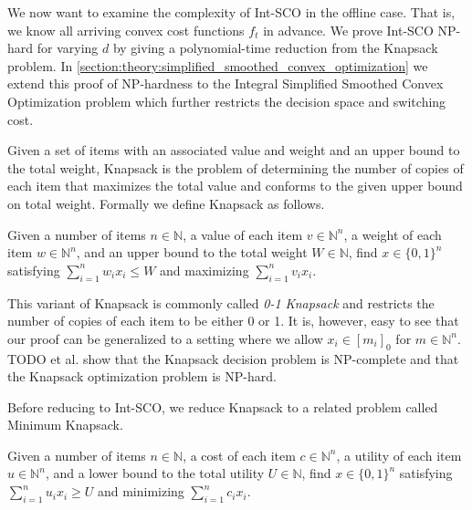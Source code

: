 We now want to examine the complexity of Int-SCO in the offline case. That is, we know all arriving convex cost functions $f_t$ in advance. We prove Int-SCO NP-hard for varying $d$ by giving a polynomial-time reduction from the Knapsack problem. In \autoref{section:theory:simplified_smoothed_convex_optimization} we extend this proof of NP-hardness to the Integral Simplified Smoothed Convex Optimization problem which further restricts the decision space and switching cost.

Given a set of items with an associated value and weight and an upper bound to the total weight, Knapsack is the problem of determining the number of copies of each item that maximizes the total value and conforms to the given upper bound on total weight. Formally we define Knapsack as follows.

\begin{problem}[Knapsack (KP)]
Given a number of items $n \in \mathbb{N}$, a value of each item $v \in \mathbb{N}^n$, a weight of each item $w \in \mathbb{N}^n$, and an upper bound to the total weight $W \in \mathbb{N}$, find $x \in \{0,1\}^n$ satisfying $\sum_{i = 1}^n w_i x_i \leq W$ and maximizing $\sum_{i=1}^n v_i x_i$.
\end{problem}

This variant of Knapsack is commonly called \textit{0-1 Knapsack} and restricts the number of copies of each item to be either 0 or 1. It is, however, easy to see that our proof can be generalized to a setting where we allow $x_i \in [m_i]_0$ for $m \in \mathbb{N}^n$. TODO et al. show that the Knapsack decision problem is NP-complete and that the Knapsack optimization problem is NP-hard.

Before reducing to Int-SCO, we reduce Knapsack to a related problem called Minimum Knapsack.

\begin{problem}
Given a number of items $n \in \mathbb{N}$, a cost of each item $c \in \mathbb{N}^n$, a utility of each item $u \in \mathbb{N}^n$, and a lower bound to the total utility $U \in \mathbb{N}$, find $x \in \{0,1\}^n$ satisfying $\sum_{i = 1}^n u_i x_i \geq U$ and minimizing $\sum_{i=1}^n c_i x_i$.
\end{problem}

